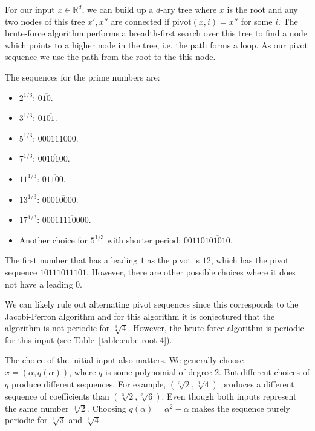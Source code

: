 For our input $x ∈ ℝ^d$, we can build up a $d$-ary tree where $x$ is the root and any
two nodes of this tree $x', x''$ are connected if $\mathrm{pivot}(x, i) = x''$
for some $i$.
The brute-force algorithm performs a breadth-first search over this tree to
find a node which points to a higher node in the tree, i.e. the path forms a loop.
As our pivot sequence we use the path from the root to the this node.

\begin{example}
  The sequences for the prime numbers are:
  \begin{itemize}
    \item $2^{1/3}$: $0\overline{10}$.
    \item $3^{1/3}$: $01\overline{01}$.
    \item $5^{1/3}$: $0\overline{00111000}$.
    \item $7^{1/3}$: $0\overline{010100}$.
    \item $11^{1/3}$: $0\overline{1100}$.
    \item $13^{1/3}$: $00\overline{010000}$.
    \item $17^{1/3}$: $000\overline{11110000}$.
    \item Another choice for $5^{1/3}$ with shorter period: $00110\overline{101010}$.
  \end{itemize}
\end{example}

\begin{remark}
  The first number that has a leading $1$ as the pivot is $12$,
  which has the pivot sequence $1\overline{0111011101}$.
  However, there are other possible choices where it does not have a leading $0$.
\end{remark}

We can likely rule out alternating pivot sequences since this corresponds to
the Jacobi-Perron algorithm and for this algorithm it is conjectured
\cite{Karpenkov2024} that the algorithm is not periodic for $\sqrt[3]{4}$.
However, the brute-force algorithm is periodic for this input (see Table~\ref{table:cube-root-4}).

The choice of the initial input also matters.
We generally choose $x = (α, q(α))$, where $q$ is some polynomial of degree $2$.
But different choices of $q$ produce different sequences.
For example, $(\sqrt[3]{2}, \sqrt[3]{4})$ produces a different sequence of coefficients than $(\sqrt[3]{2}, \sqrt[3]{6})$.
Even though both inputs represent the same number $\sqrt[3]{2}$.
Choosing $q(α) = α^2 - α$ makes the sequence purely periodic for $\sqrt[3]{3}$ and $\sqrt[3]{4}$.

